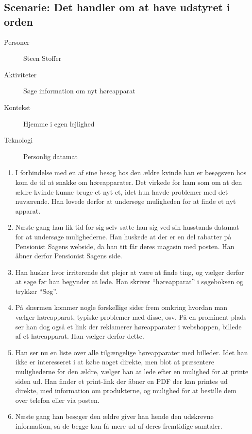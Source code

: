 \subsection{Scenarie: Det handler om at have udstyret i orden}
\begin{description}
    \item[Personer] Steen Stoffer
    \item[Aktiviteter] Søge information om nyt høreapparat
    \item[Kontekst] Hjemme i egen lejlighed
    \item[Teknologi] Personlig datamat
\end{description}

\begin{enumerate}
    \item I forbindelse med en af sine besøg hos den ældre kvinde han er besøgsven hos kom de til at snakke om høreapparater. Det virkede for ham som om at den ældre kvinde kunne bruge et nyt et, idet hun havde problemer med det nuværende. Han lovede derfor at undersøge muligheden for at finde et nyt apparat.
    \item Næste gang han fik tid for sig selv satte han sig ved sin husstands datamat for at undersøge mulighederne. Han huskede at der er en del rabatter på Pensionist Sagens webside, da han tit får deres magasin med posten. Han åbner derfor Pensionist Sagens side.
    \item Han husker hvor irriterende det plejer at være at finde ting, og vælger derfor at søge før han begynder at lede. Han skriver ``høreapparat'' i søgeboksen og trykker ``Søg''.
    \item På skærmen kommer nogle forskellige sider frem omkring hvordan man vælger høreapparat, typiske problemer med disse, osv. På en prominent plads ser han dog også et link der reklamerer høreapparater i webshoppen, billede af et høreapparat. Han vælger derfor dette.
    \item Han ser nu en liste over alle tilgængelige høreapparater med billeder. Idet han ikke er interesseret i at købe noget direkte, men blot at præsentere mulighederne for den ældre, vælger han at lede efter en mulighed for at printe siden ud. Han finder et print-link der åbner en PDF der kan printes ud direkte, med information om produkterne, og mulighed for at bestille dem over telefon eller via posten.
    \item Næste gang han besøger den ældre giver han hende den udskrevne information, så de begge kan få mere ud af deres fremtidige samtaler.
\end{enumerate}
